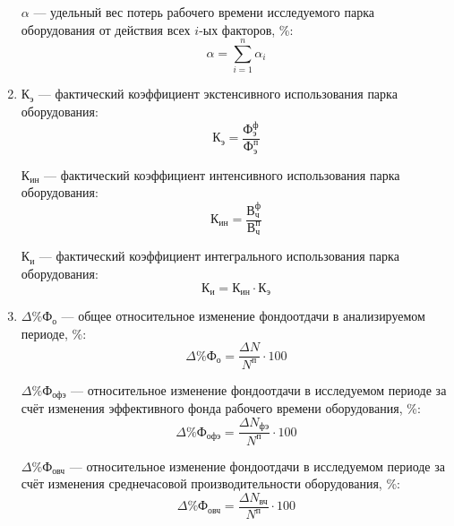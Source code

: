 \begin{enumerate}
    $ \alpha $ --- удельный вес потерь рабочего времени исследуемого парка оборудования
    от действия всех $i$-ых факторов, \%:
    \begin{equation*}
      \alpha = \sum\limits^{n}_{i=1}\alpha_i
    \end{equation*}

  \item $ \text{К}_{\text{э}} $ --- фактический коэффициент экстенсивного использования парка оборудования:
    \begin{equation*}
      \text{К}_{\text{э}} = \dfrac{\text{Ф}^{\text{ф}}_{\text{э}}}{\text{Ф}^{\text{п}}_{\text{э}}}
    \end{equation*}

    $ \text{К}_{\text{ин}} $ --- фактический коэффициент интенсивного использования парка оборудования:
    \begin{equation*}
      \text{К}_{\text{ин}} = \dfrac{\text{В}^{\text{ф}}_{\text{ч}}}{\text{В}^{\text{п}}_{\text{ч}}}
    \end{equation*}

    $ \text{К}_{\text{и}} $ --- фактический коэффициент интегрального использования парка оборудования:
    \begin{equation*}
      \text{К}_{\text{и}} = \text{К}_{\text{ин}} \cdot \text{К}_{\text{э}}
    \end{equation*}

  \item $ \Delta \% \text{Ф}_{\text{о}} $ --- общее относительное изменение фондоотдачи
    в анализируемом периоде, \%:
    \begin{equation*}
      \Delta \% \text{Ф}_{\text{о}} = \dfrac{\Delta N}{N^{\text{п}}} \cdot 100
    \end{equation*}

    $ \Delta \% \text{Ф}_{\text{офэ}} $ --- относительное изменение фондоотдачи в исследуемом периоде
    за счёт изменения эффективного фонда рабочего времени оборудования, \%:
    \begin{equation*}
      \Delta \% \text{Ф}_{\text{офэ}} = \dfrac{\Delta N_{\text{фэ}}}{N^{\text{п}}} \cdot 100
    \end{equation*}

    $ \Delta \% \text{Ф}_{\text{овч}} $ --- относительное изменение фондоотдачи в исследуемом периоде
    за счёт изменения среднечасовой производительности оборудования, \%:
    \begin{equation*}
      \Delta \% \text{Ф}_{\text{овч}} = \dfrac{\Delta N_{\text{вч}}}{N^{\text{п}}} \cdot 100
    \end{equation*}

\end{enumerate}

